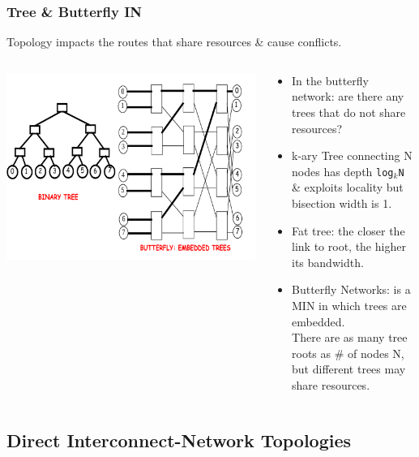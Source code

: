 \documentclass{beamer}
\newcommand{\emp}[1]{\textcolor{DikuRed}{ #1}}
\begin{document}
\begin{frame}[fragile,t]
\frametitle{Tree \& Butterfly IN}

Topology impacts the routes that share resources \& cause conflicts.

\medskip

\begin{columns}
\includegraphics[width=48ex]{FigsInterconnect/BTreeButerfly}
\begin{scriptsize}
\begin{itemize}
    \item \alert{In the butterfly network: are there any trees that do not share resources?}\pause
    \item \emp{k-ary Tree} connecting N nodes has depth {\tt log$_k$N} \& exploits locality
                 but \alert{bisection width is 1.}\\
    \item \emp{Fat tree}: the closer the link to root, the higher its bandwidth. 
    \item \emp{Butterfly Networks}: is a MIN in which trees are embedded.\\
            There are as many tree roots as \# of nodes N, but different trees
            may share resources.
\end  {itemize}
\end{scriptsize}
\end{columns}

\end{frame}


\subsection{Direct Interconnect-Network Topologies}
\begin{frame}[fragile]
	\tableofcontents[currentsubsection]
\end{frame}
\end{document}
